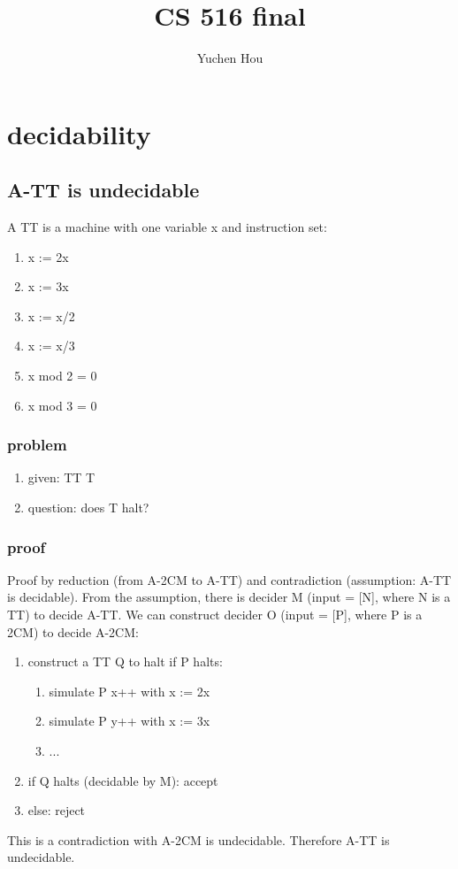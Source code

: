 \documentclass{article}
\begin{document}
\lstset{language=python, tabsize=4}
\title{CS 516 final}
\author{Yuchen Hou}
\maketitle

\section{decidability}

\subsection{A-TT is undecidable}
A TT is a machine with one variable x and instruction set:
\begin{enumerate}
	\item x := 2x
	\item x := 3x
	\item x := x/2
	\item x := x/3
	\item x mod 2 = 0
	\item x mod 3 = 0
\end{enumerate}

\subsubsection{problem}
\begin{enumerate}
	\item given: TT T
	\item question: does T halt?
\end{enumerate}

\subsubsection{proof}
Proof by reduction (from A-2CM to A-TT) and contradiction (assumption: A-TT is 
decidable).
From the assumption, there is decider M (input = [N], where N is a TT) to 
decide A-TT.
We can construct decider O (input = [P], where P is a 2CM) to decide A-2CM:
\begin{enumerate}
	\item construct a TT Q to halt if P halts:
	\begin{enumerate}
		\item simulate P x++ with x := 2x
		\item simulate P y++ with x := 3x
		\item ...
	\end{enumerate}
	\item if Q halts (decidable by M): accept
	\item else: reject
\end{enumerate}
This is a contradiction with A-2CM is undecidable. Therefore A-TT is 
undecidable.
\end{document}
